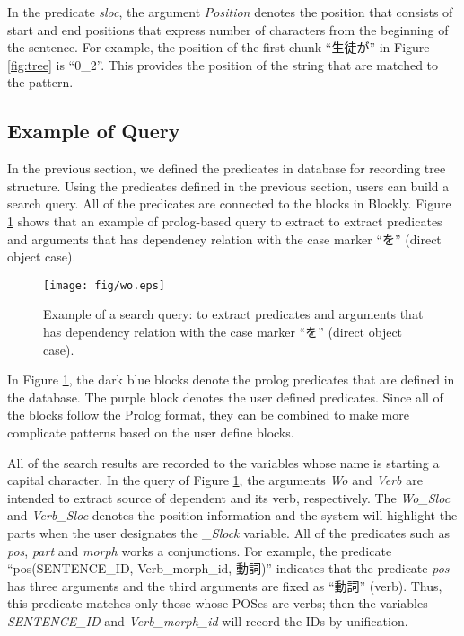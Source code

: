 \documentclass[conference]{IEEEtran}
\begin{document}
In the predicate {\it sloc}, the argument {\it Position} denotes
the position that consists of start and end positions that express number of characters
from the beginning of the sentence.
For example, the position of the first chunk ``生徒が'' in Figure \ref{fig:tree}
is ``0\_2''. This provides the position of the string that are matched to the pattern.



\subsection{Example of Query}
\label{sec:example}
In the previous section, we defined the predicates in database for recording tree structure.
Using the predicates defined in the previous section, 
users can build a search query. All of the predicates are connected to the blocks
in Blockly. Figure \ref{fig:pattern} shows that an example of prolog-based query to extract
to extract predicates and arguments that has dependency relation with the case marker ``を''
(direct object case).

\begin{figure}[htbp]
\centerline{\texttt{[image: fig/wo.eps]}}
\caption{Example of a search query: to extract predicates and arguments that has dependency relation with the case marker ``を'' (direct object case).}
\label{fig:pattern}
\end{figure}

In Figure \ref{fig:pattern}, the dark blue blocks denote the prolog predicates that are defined
in the database. The purple block denotes the user defined predicates. Since all of the blocks
follow the Prolog format, they can be combined to make more complicate patterns based on the user define blocks.

All of the search results are recorded to the variables whose name is starting a capital character.
In the query of Figure \ref{fig:pattern}, the arguments {\it Wo} and {\it Verb} are intended
to extract source of dependent and its verb, respectively.
The {\it Wo\_Sloc} and {\it Verb\_Sloc} denotes the position information and the system
will highlight the parts when the user designates the {\it \_Slock} variable. 
All of the predicates such as {\it pos}, {\it part} and {\it morph} works a conjunctions.
For example, the predicate ``pos(SENTENCE\_ID, Verb\_morph\_id, 動詞)'' indicates that
the predicate {\it pos} has three arguments and the third arguments are fixed as ``動詞'' (verb).
Thus, this predicate matches only those whose POSes are verbs; then the variables
{\it SENTENCE\_ID} and {\it Verb\_morph\_id} will record the IDs by unification. 
\end{document}
